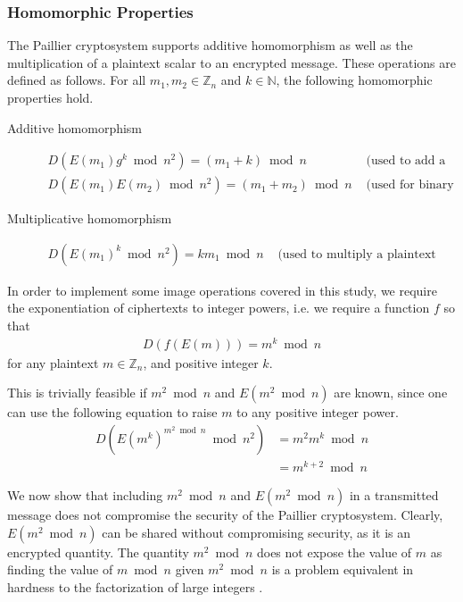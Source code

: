 \subsubsection{Homomorphic Properties}
The Paillier cryptosystem supports additive homomorphism as well as the multiplication of a plaintext scalar to an encrypted message. These operations are defined as follows.
For all $m_1,m_2 \in \mathbb{Z}_n$ and $k\in \mathbb{N}$, the following homomorphic properties hold.
\begin{description}
  \item[Additive homomorphism]
  \begin{align*}
    D(E(m_1)g^k\bmod n^2)=(m_1+k)\bmod n & \text{ (used to add a constant)}\\
    D(E(m_1)E(m_2)\bmod n^2)=(m_1+m_2)\bmod n & \text{ (used for binary addition)}
  \end{align*}
  \item[Multiplicative homomorphism]
  \begin{align*}
    D(E(m_1)^k\bmod n^2)= km_1\bmod n & \text{ (used to multiply a plaintext constant)}
  \end{align*}
\end{description}
In order to implement some image operations covered in this study, we require the exponentiation of ciphertexts to integer powers, i.e. we require a function $f$ so that
\begin{align*}
	D(f(E(m))) = m^k\bmod n
\end{align*}
for any plaintext $m \in \mathbb{Z}_n$, and positive integer $k$.

This is trivially feasible if $m^2 \bmod n$ and $E(m^2 \bmod n)$ are known, since one can use the following equation to raise $m$ to any positive integer power.
\begin{align*}
	D(E(m^k)^{m^2 \bmod n}\bmod n^2) &= m^2m^k\bmod n \\
	&= m^{k+2}\bmod n
\end{align*}

We now show that including $m^2 \bmod n$ and $E(m^2 \bmod n)$ in a transmitted message does not compromise the security of the Paillier cryptosystem. Clearly, $E(m^2 \bmod n)$ can be shared without compromising security, as it is an encrypted quantity. The quantity $m^2 \bmod n$ does not expose the value of $m$ as finding the value of $m \bmod n$ given $m^2 \bmod n$ is a problem equivalent in hardness to the factorization of large integers \cite{crandall_prime_2005}.

